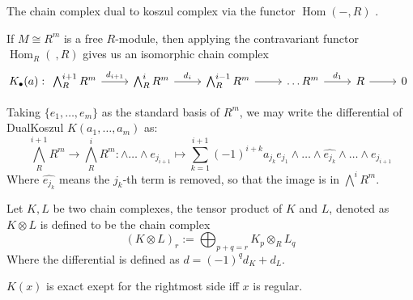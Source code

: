 \begin{definition}
	\label{def:DualKoszulComplex}
	\leanok
	The chain complex dual to koszul complex via the functor $\operatorname{Hom}(-,R)$ .
\end{definition}

\begin{proposition}
	\label{prop:free_koszul_is_iso_to_dual}
	If $M \cong R^m$ is a free $R$-module, then applying the contravariant functor $\operatorname{Hom}_R(\ , R)$ gives us an isomorphic chain complex 
	$$K_{\bullet}(a) :\begin{tikzcd}
	\bigwedge^{i+1}_R R^m \arrow[r, "d_{i+1}"] & \bigwedge^i_R R^m \arrow[r, "d_i"] & \bigwedge^{i-1}_R R^m \arrow[r] & \dots R^m \arrow[r, "d_1"] & R \arrow[r] & 0
	\end{tikzcd}$$
\end{proposition}

\begin{proposition}
	\label{prop:diff_of_dual_koszul}
	Taking $\{e_1, \dots, e_m\}$ as the standard basis of $R^m$, we may write the differential of DualKoszul $K(a_1, \dots, a_m)$ as:
	$$\bigwedge^{i+1}_R R^m \to \bigwedge^i_R R^m: \wedge \dots \wedge e_{j_{i+1}} \mapsto \sum_{k=1}^{i+1} (-1)^{i+k} a_{j_k} e_{j_{1}} \wedge \dots \wedge \widehat{e_{j_k}} \wedge \dots \wedge e_{j_{i+1}}$$
	Where $\widehat{e_{j_k}}$ means the $j_k$-th term is removed, so that the image is in $\bigwedge^{i} R^m$.
\end{proposition}

\begin{definition}
	\label{def:complex_tensor_product}
	Let $K, L$ be two chain complexes, the tensor product of $K$ and $L$, denoted as $K \otimes L$ is defined to be the chain complex
	$$(K \otimes L)_r := \bigoplus_{p + q = r}K_p \otimes_R L_q$$
	Where the differential is defined as $d = (-1)^q d_K + d_L$.
\end{definition}

\begin{lemma}
	\label{lem:koszul_of_length_2}
	$K(x)$ is exact exept for the rightmost side iff $x$ is regular.
\end{lemma}

